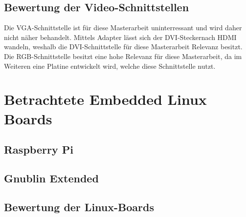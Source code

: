 \subsection{Bewertung der Video-Schnittstellen}
Die VGA-Schnittstelle ist für diese Masterarbeit uninterressant und wird daher nicht näher behandelt.
Mittels Adapter lässt sich der DVI-Steckernach HDMI wandeln, weshalb die DVI-Schnittstelle für diese Masterarbeit Relevanz besitzt.
Die RGB-Schnittstelle besitzt eine hohe Relevanz für diese Masterarbeit, da im Weiteren eine Platine entwickelt wird, welche diese Schnittstelle nutzt.

\section{Betrachtete Embedded Linux Boards}
\subsection{Raspberry Pi}
\subsection{Gnublin Extended}
\subsection{Bewertung der Linux-Boards}
